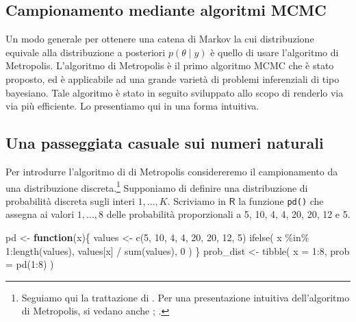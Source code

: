 \documentclass[
  11pt,
]{krantz}
\makeatletter
\newenvironment{Shaded}{\begin{snugshade}}{\end{snugshade}}
\newcommand{\AttributeTok}[1]{\textcolor[rgb]{0.61,0.61,0.61}{#1}}
\newcommand{\ControlFlowTok}[1]{\textcolor[rgb]{0.27,0.27,0.27}{\textbf{#1}}}
\newcommand{\DecValTok}[1]{\textcolor[rgb]{0.06,0.06,0.06}{#1}}
\newcommand{\FunctionTok}[1]{\textcolor[rgb]{0,0,0}{#1}}
\newcommand{\NormalTok}[1]{#1}
\newcommand{\OtherTok}[1]{\textcolor[rgb]{0.37,0.37,0.37}{#1}}
\newcommand{\SpecialCharTok}[1]{\textcolor[rgb]{0,0,0}{#1}}
\newenvironment{kframe}{%
\medskip{}
\setlength{\fboxsep}{.8em}
 \def\at@end@of@kframe{}%
 \ifinner\ifhmode%
  \def\at@end@of@kframe{\end{minipage}}%
  \begin{minipage}{\columnwidth}%
 \fi\fi%
 \def\FrameCommand##1{\hskip\@totalleftmargin \hskip-\fboxsep
 \colorbox{shadecolor}{##1}\hskip-\fboxsep
     \hskip-\linewidth \hskip-\@totalleftmargin \hskip\columnwidth}%
 \MakeFramed {\advance\hsize-\width
   \@totalleftmargin\z@ \linewidth\hsize
   \@setminipage}}%
 {\par\unskip\endMakeFramed%
 \at@end@of@kframe}
\renewenvironment{Shaded}{\begin{kframe}}{\end{kframe}}
\newcommand{\R}{\textsf{R}} %
\theoremstyle{definition}
\theoremstyle{definition}
\theoremstyle{definition}
\theoremstyle{definition}
\theoremstyle{remark}
\makeatother
\begin{document}
\hypertarget{campionamento-mediante-algoritmi-mcmc}{%
\subsection{Campionamento mediante algoritmi MCMC}\label{campionamento-mediante-algoritmi-mcmc}}

Un modo generale per ottenere una catena di Markov la cui distribuzione equivale alla distribuzione a posteriori \(p(\theta \mid y)\) è quello di usare l'algoritmo di Metropolis. L'algoritmo di Metropolis è il primo algoritmo MCMC che è stato proposto, ed è applicabile ad una grande varietà di problemi inferenziali di tipo bayesiano. Tale algoritmo è stato in seguito sviluppato allo scopo di renderlo via via più efficiente. Lo presentiamo qui in una forma intuitiva.

\hypertarget{una-passeggiata-casuale-sui-numeri-naturali}{%
\subsection{Una passeggiata casuale sui numeri naturali}\label{una-passeggiata-casuale-sui-numeri-naturali}}

Per introdurre l'algoritmo di di Metropolis considereremo il campionamento da una distribuzione discreta.\footnote{Seguiamo qui la trattazione di \citet{albert2019probability}. Per una presentazione intuitiva dell'algoritmo di Metropolis, si vedano anche \citet{doing_bayesian_data_an}; \citet{McElreath_rethinking}.} Supponiamo di definire una distribuzione di probabilità discreta sugli interi \(1,\dots, K\). Scriviamo in \(\R\) la funzione \texttt{pd()} che assegna ai valori \(1,\dots, 8\) delle probabilità proporzionali a 5, 10, 4, 4, 20, 20, 12 e 5.

\begin{Shaded}
\begin{Highlighting}[]
\NormalTok{pd }\OtherTok{\textless{}{-}} \ControlFlowTok{function}\NormalTok{(x)\{}
\NormalTok{  values }\OtherTok{\textless{}{-}} \FunctionTok{c}\NormalTok{(}\DecValTok{5}\NormalTok{, }\DecValTok{10}\NormalTok{, }\DecValTok{4}\NormalTok{, }\DecValTok{4}\NormalTok{, }\DecValTok{20}\NormalTok{, }\DecValTok{20}\NormalTok{, }\DecValTok{12}\NormalTok{, }\DecValTok{5}\NormalTok{)}
  \FunctionTok{ifelse}\NormalTok{(}
\NormalTok{    x }\SpecialCharTok{\%in\%} \DecValTok{1}\SpecialCharTok{:}\FunctionTok{length}\NormalTok{(values),}
\NormalTok{    values[x] }\SpecialCharTok{/} \FunctionTok{sum}\NormalTok{(values),}
    \DecValTok{0}
\NormalTok{  )}
\NormalTok{\}}
\NormalTok{prob\_dist }\OtherTok{\textless{}{-}} \FunctionTok{tibble}\NormalTok{(}
  \AttributeTok{x =} \DecValTok{1}\SpecialCharTok{:}\DecValTok{8}\NormalTok{,}
  \AttributeTok{prob =} \FunctionTok{pd}\NormalTok{(}\DecValTok{1}\SpecialCharTok{:}\DecValTok{8}\NormalTok{)}
\NormalTok{)}
\end{Highlighting}
\end{Shaded}
\end{document}
